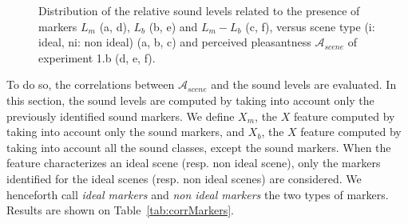 \documentclass[12pt]{elsarticle}
\newcommand{\cf}{cf.}
\begin{document}
\begin{figure}[t]
        \caption{Distribution of the relative sound levels related to the presence of markers $L_m$ (a, d), $L_b$ (b, e) and $L_m-L_b$ (c, f), versus scene type (i: ideal, ni: non ideal) (a, b, c) and perceived pleasantness $\mathcal{A}_{scene}$ of experiment 1.b (d, e, f).}\label{fig:soundlevelMarker}
\end{figure}


To do so, the correlations between $\mathcal{A}_{scene}$ and the sound levels are evaluated. In this section, the sound levels are computed by taking into account only the previously identified sound markers. We define $X_m$, the $X$ feature computed by taking into account only the sound markers, and $X_b$, the $X$ feature computed by taking into account all the sound classes, except the sound markers. When the feature characterizes an ideal scene (resp. non ideal scene), only the markers identified for the ideal scenes (resp. non ideal scenes) are considered. We henceforth call \emph{ideal markers} and \emph{non ideal markers} the two types of markers. Results are shown on Table~\ref{tab:corrMarkers}.

\end{document}
